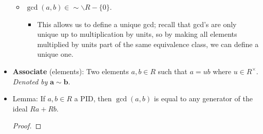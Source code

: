 \documentclass[../notes.tex]{subfiles}
\begin{document}
\begin{itemize}
\begin{itemize}
        \item $\gcd(a,b)\in\sim\backslash R-\{0\}$.
        \begin{itemize}
            \item This allows us to define a unique gcd; recall that gcd's are only unique up to multiplication by units, so by making all elements multiplied by units part of the same equivalence class, we can define a unique one.
        \end{itemize}
    \end{itemize}
    \item \textbf{Associate} (elements): Two elements $a,b\in R$ such that $a=ub$ where $u\in R^\times$. \emph{Denoted by} $\bm{a\sim b}$.
    \item Lemma: If $a,b\in R$ a PID, then $\gcd(a,b)$ is equal to any generator of the ideal $Ra+Rb$.
    \begin{proof}


\end{proof}
\end{itemize}
\end{document}
